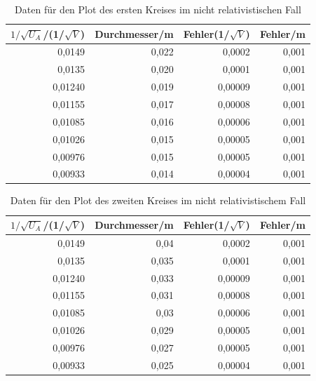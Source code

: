 \documentclass[12pt,a4paper]{article}
\begin{document}
\begin{table}[H]
\caption{Daten für den Plot des ersten Kreises im nicht relativistischen Fall}
\begin{center}
\begin{tabular}{|r|r|r|r|}
\hline
\multicolumn{1}{|l|}{$1/\sqrt{U_A}$/(1/$\sqrt{V}$)} & \multicolumn{1}{l|}{Durchmesser/m} & \multicolumn{1}{l|}{Fehler(1/$\sqrt{V}$)} & \multicolumn{1}{l|}{Fehler/m} \\ \hline
0,0149 & 0,022 & 0,0002 & 0,001 \\ \hline
0,0135 & 0,020 & 0,0001 & 0,001 \\ \hline
0,01240 & 0,019 & 0,00009 & 0,001 \\ \hline
0,01155 & 0,017 & 0,00008 & 0,001 \\ \hline
0,01085 & 0,016 & 0,00006 & 0,001 \\ \hline
0,01026 & 0,015 & 0,00005 & 0,001 \\ \hline
0,00976 & 0,015 & 0,00005 & 0,001 \\ \hline
0,00933 & 0,014 & 0,00004 & 0,001 \\ \hline
\end{tabular}
\end{center}
\label{tab:p_1}
\end{table}

\begin{table}[H]
\caption{Daten für den Plot des zweiten Kreises im nicht relativistischem Fall}
\begin{center}
\begin{tabular}{|r|r|r|r|}
\hline
\multicolumn{1}{|l|}{$1/\sqrt{U_A}$/(1/$\sqrt{V}$)} & \multicolumn{1}{l|}{Durchmesser/m} & \multicolumn{1}{l|}{Fehler(1/$\sqrt{V}$)} & \multicolumn{1}{l|}{Fehler/m} \\ \hline
0,0149 & 0,04 & 0,0002 & 0,001 \\ \hline
0,0135 & 0,035 & 0,0001 & 0,001 \\ \hline
0,01240 & 0,033 & 0,00009 & 0,001 \\ \hline
0,01155 & 0,031 & 0,00008 & 0,001 \\ \hline
0,01085 & 0,03 & 0,00006 & 0,001 \\ \hline
0,01026 & 0,029 & 0,00005 & 0,001 \\ \hline
0,00976 & 0,027 & 0,00005 & 0,001 \\ \hline
0,00933 & 0,025 & 0,00004 & 0,001 \\ \hline
\end{tabular}
\end{center}
\label{tab:p_2}
\end{table}
\end{document}
